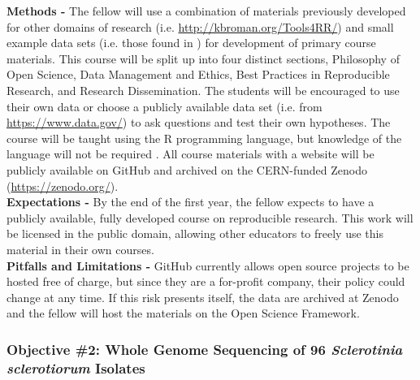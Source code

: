 \documentclass[12pt,letterpaper]{article}
\begin{document}
\noindent \textbf{Methods -} 
The fellow will use a combination of materials previously developed for other domains of research (i.e. \url{http://kbroman.org/Tools4RR/}) and small example data sets (i.e. those found in \citet{sparks2008ecology}) for development of primary course materials. 
This course will be split up into four distinct sections, Philosophy of Open Science, Data Management and Ethics, Best Practices in Reproducible Research, and Research Dissemination.
The students will be encouraged to use their own data or choose a publicly available data set (i.e. from \url{https://www.data.gov/}) to ask questions and test their own hypotheses.
The course will be taught using the R programming language, but knowledge of the language will not be required \citep{R2017}.
All course materials with a website will be publicly available on GitHub and archived on the CERN-funded Zenodo (\url{https://zenodo.org/}).\\
\noindent \textbf{Expectations -}
By the end of the first year, the fellow expects to have a publicly available, fully developed course on reproducible research.
This work will be licensed in the public domain, allowing other educators to freely use this material in their own courses.\\
\noindent \textbf{Pitfalls and Limitations -}
GitHub currently allows open source projects to be hosted free of charge, but since they are a for-profit company, their policy could change at any time. If this risk presents itself, the data are archived at Zenodo and the fellow will host the materials on the Open Science Framework.

\subsubsection*{Objective \#2: Whole Genome Sequencing of 96 \textit{Sclerotinia sclerotiorum} Isolates}
\end{document}
